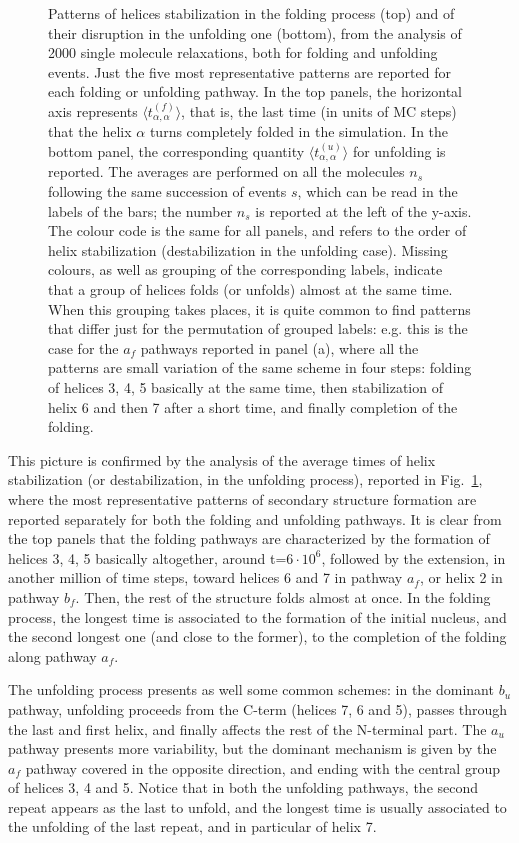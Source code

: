 \begin{figure}
\caption{
Patterns of helices stabilization in the folding process (top) and of their
disruption in the unfolding one (bottom), from the analysis of 2000 single
molecule relaxations, both for folding and unfolding events. Just the five most
representative patterns are reported for each folding or unfolding pathway. In
the top panels, the horizontal axis represents $\langle t_{\alpha,\alpha}^{(f)}
\rangle$, that is, the last time (in units of MC steps) that the helix $\alpha$
turns completely folded in the simulation. In the bottom panel, the
corresponding quantity $\langle t_{\alpha,\alpha}^{(u)} \rangle$ for unfolding
is reported. The averages are performed on all the molecules $n_s$ following the
same succession of events $s$, which can be read in the labels of the bars; the
number $n_s$ is reported at the left of the y-axis. The colour code is the same
for all panels, and refers to the order of helix stabilization (destabilization
in the unfolding case). Missing colours, as well as grouping of the
corresponding labels, indicate that a group of helices folds (or unfolds) almost
at the same time. When this grouping takes places, it is quite common to  find
patterns that differ just for the permutation of grouped labels: e.g. this is
the case for the $a_f$ pathways reported in panel (a), where all the patterns
are small variation of the same scheme in four steps: folding of helices 3, 4, 5
basically at the same time, then stabilization of helix 6 and then 7 after a
short time, and finally completion of the folding.
}
\label{fig:avetimes}
\end{figure}


This picture is confirmed by the analysis of the average times of helix
stabilization (or destabilization, in the unfolding process), reported in
Fig.~\ref{fig:avetimes}, where the most representative patterns of secondary
structure formation are reported separately  for both the folding and unfolding
pathways. It is clear from the top panels that the folding pathways are
characterized  by  the formation of helices 3, 4, 5 basically altogether, around
t=$6\cdot 10^6$, followed by the extension, in another million of time steps,
toward helices 6 and 7 in pathway $a_f$, or helix 2 in pathway $b_f$. Then, the
rest of the structure folds almost at once. In the folding process, the longest
time is associated to the formation of the initial nucleus, and the second
longest one (and close to the former), to the completion of  the folding along
pathway $a_f$.


The unfolding process presents as well some common schemes: in the dominant
$b_u$ pathway, unfolding proceeds from the C-term (helices 7, 6 and 5), passes
through the last and first helix, and finally affects the rest of the N-terminal
part. The $a_u$ pathway presents more variability, but the dominant mechanism is
given by the $a_f$ pathway covered in the opposite direction, and ending with
the central group of helices 3, 4 and 5. Notice that in both the unfolding
pathways, the second repeat appears as the last to unfold, and  the longest time
is usually associated to the unfolding of the last repeat, and in particular of
helix 7.


